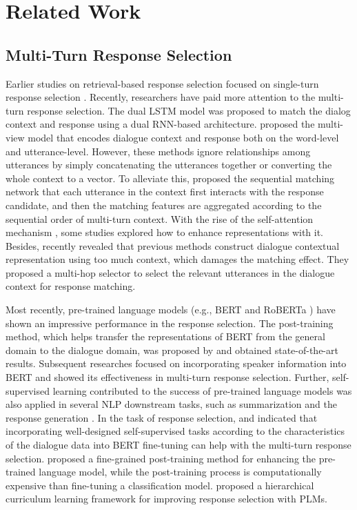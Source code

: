 \documentclass[letterpaper]{article} \usepackage{aaai22}  \usepackage{times}  \usepackage{helvet}  \usepackage{courier}  \usepackage[hyphens]{url}  \usepackage{graphicx} \urlstyle{rm} \def\UrlFont{\rm}  \usepackage{natbib}  \usepackage{caption} \DeclareCaptionStyle{ruled}{labelfont=normalfont,labelsep=colon,strut=off} \frenchspacing  \setlength{\pdfpagewidth}{8.5in}  \setlength{\pdfpageheight}{11in}  \usepackage{algorithm}
\begin{document}
\section{Related Work}
\subsection{Multi-Turn Response Selection}
Earlier studies on retrieval-based response selection focused on single-turn response selection \cite{wang2013dataset,hu2015convolutional,wang2015syntax}. Recently, researchers have paid more attention to the multi-turn response selection. The dual LSTM model \cite{lowe2015ubuntu} was proposed to match the dialog context and response using a dual RNN-based architecture. \citet{zhou2016multi} proposed the multi-view model that encodes dialogue context and response both on the word-level and utterance-level. However, these methods ignore relationships among utterances by simply concatenating the utterances together or converting the whole context to a vector. To alleviate this, \citet{wu2016sequential} proposed the sequential matching network that each utterance in the context first interacts with the response candidate, and then the matching features are aggregated according to the sequential order of multi-turn context. With the rise of the self-attention mechanism \cite{vaswani2017attention}, some studies \cite{zhou2018multi,tao2019multi} explored how to enhance representations with it. Besides, \citet{yuan2019multi} recently revealed that previous methods construct dialogue contextual representation using too much context, which damages the matching effect. They proposed a multi-hop selector to select the relevant utterances in the dialogue context for response matching.

Most recently, pre-trained language models (e.g., BERT \cite{devlin2018bert} and RoBERTa \cite{liu2019roberta}) have shown an impressive performance in the response selection. The post-training method, which helps transfer the representations of BERT from the general domain to the dialogue domain, was proposed by \citet{whang2020domain} and obtained state-of-the-art results. Subsequent researches \cite{gu2020speaker,lu2020improving} focused on incorporating speaker information into BERT and showed its effectiveness in multi-turn response selection. Further, self-supervised learning contributed to the success of pre-trained language models was also applied in several NLP downstream tasks, such as summarization \cite{wang2019self} and the response generation \cite{zhao2020learning}. In the task of response selection, \citet{whang2020response} and \citet{xu2020learning} indicated that incorporating well-designed self-supervised tasks according to the characteristics of the dialogue data into BERT fine-tuning can help with the multi-turn response selection. \citet{han2021fine} proposed a fine-grained post-training method for enhancing the pre-trained language model, while the post-training process is computationally expensive than fine-tuning a classification model. \citet{su2020dialogue} proposed a hierarchical curriculum learning framework for improving response selection with PLMs.
\end{document}
